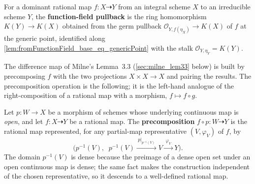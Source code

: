 \begin{definition}\leanok
  \label{def:functionFieldPullback}
  For a dominant rational map \(f \colon X \dashrightarrow Y\) from an integral scheme
  \(X\) to an irreducible scheme \(Y\), the \textbf{function-field pullback} is the ring
  homomorphism \(K(Y) \to K(X)\) obtained from the germ pullback
  \(\mathcal O_{Y, f(\eta_X)} \to K(X)\) of \(f\) at the generic point, identified along
  \cref{lem:fromFunctionField_base_eq_genericPoint} with the stalk
  \(\mathcal O_{Y,\eta_Y} = K(Y)\).
\end{definition}

The difference map of Milne's Lemma~3.3 (\cref{sec:milne_lem33} below) is built by
precomposing \(f\) with the two projections \(X \times X \to X\) and pairing the results.
The precomposition operation is the following; it is the left-hand analogue of the
right-composition of a rational map with a morphism, \(f \mapsto f \circ g\).

\begin{definition}\leanok
  \label{def:rationalMap_precomp}
  Let \(p \colon W \to X\) be a morphism of schemes whose underlying continuous map is
  \emph{open}, and let \(f \colon X \dashrightarrow Y\) be a rational map. The
  \textbf{precomposition} \(f \circ p \colon W \dashrightarrow Y\) is the rational map
  represented, for any partial-map representative \((V, \varphi_V)\) of \(f\), by
  \[
    \bigl(p^{-1}(V),\; \; p^{-1}(V) \xrightarrow{\;p|_{p^{-1}(V)}\;} V
    \xrightarrow{\;\varphi_V\;} Y\bigr).
  \]
  The domain \(p^{-1}(V)\) is dense because the preimage of a dense open set under an open
  continuous map is dense; the same fact makes the construction independent of the chosen
  representative, so it descends to a well-defined rational map.
\end{definition}


